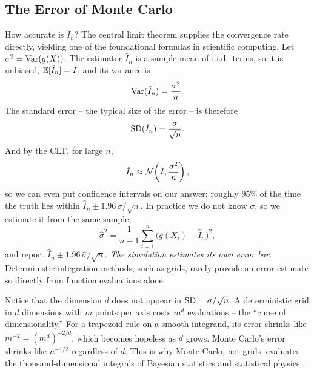 \subsection{The Error of Monte Carlo}
\label{ch35:error}
How accurate is $\hat I_n$? The central limit theorem supplies the convergence rate
directly, yielding one of the foundational formulas in scientific computing.
Let $\sigma^2 = \operatorname{Var}(g(X))$. The estimator $\hat I_n$ is a sample mean of i.i.d.\
terms, so it is unbiased, $\operatorname{\mathbb{E}}[\hat I_n] = I$, and its variance is
\[
  \operatorname{Var}(\hat I_n) = \frac{\sigma^2}{n}.
\]
The standard error -- the typical size of the error -- is therefore
\[
  \operatorname{SD}(\hat I_n) = \frac{\sigma}{\sqrt n}.
\]
And by the CLT, for large $n$,
\[
  \hat I_n \approx \mathcal{N}\!\left(I, \frac{\sigma^2}{n}\right),
\]
so we can even put confidence intervals on our answer: roughly $95\%$ of the time
the truth lies within $\hat I_n \pm 1.96\,\sigma/\sqrt n$. In practice we do not
know $\sigma$, so we estimate it from the same sample,
\[
  \hat\sigma^2 = \frac{1}{n-1}\sum_{i=1}^n \bigl(g(X_i) - \hat I_n\bigr)^2,
\]
and report $\hat I_n \pm 1.96\,\hat\sigma/\sqrt n$. \emph{The simulation estimates
its own error bar.} Deterministic integration methods, such as grids, rarely provide an error estimate
so directly from function evaluations alone.
\begin{aestheticbox}
Notice that the dimension $d$ does not appear in $\operatorname{SD} = \sigma/\sqrt n$.
A deterministic grid in $d$ dimensions with $m$ points per axis costs
$m^d$ evaluations -- the ``curse of dimensionality.'' For a trapezoid rule on a smooth integrand, its error shrinks like
$m^{-2} = (m^d)^{-2/d}$, which becomes hopeless as $d$ grows. Monte Carlo's error
shrinks like $n^{-1/2}$ regardless of $d$.
This is why Monte Carlo, not grids, evaluates the thousand-dimensional integrals of
Bayesian statistics and statistical physics.
\end{aestheticbox}

